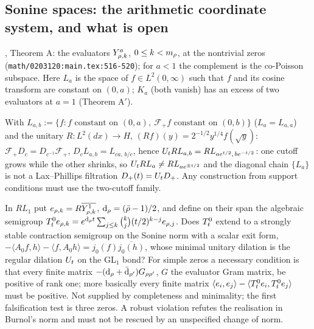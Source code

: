 \subsection{Sonine spaces: the arithmetic coordinate system, and what is open}

\begin{citedfact}
\label{cit:burnol-sonine-evaluators}
\cite{burnol2004systems}, Theorem A: the evaluators $Y^a_{\rho,k}$, $0\le k<m_\rho$, at the nontrivial zeros
\texttt{}
(\texttt{math/0203120:main.tex:516-520}); for $a<1$ the complement is the co-Poisson subspace. Here $L_a$ is the space of
$f\in L^2(0,\infty)$ such that $f$ and its cosine transform are constant on $(0,a)$; $K_a$ (both vanish) has an excess of
two evaluators at $a = 1$ (Theorem A$'$).
\end{citedfact}

\begin{proposition}
\label{prop:sonine-two-cutoff-covariance}
With $L_{a,b} := \{f: f\text{ constant on }(0,a),\ \mathcal F_+f\text{ constant on }(0,b)\}$ ($L_a = L_{a,a}$) and the
unitary $R: L^2(dx)\to H$, $(Rf)(y) = 2^{-1/2}y^{1/4}f(\sqrt y)$: $\mathcal F_+D_c = D_{c^{-1}}\mathcal F_+$,
$D_c L_{a,b} = L_{ca,\,b/c}$, hence $U_t RL_{a,b} = RL_{ae^{t/2},\,be^{-t/2}}$: one cutoff grows
while the other shrinks, so $U_t RL_a\ne RL_{ae^{\pm t/2}}$ and the diagonal chain $\{L_a\}$ is not a
Lax--Phillips filtration $D_+(t) = U_t D_+$. Any construction from support conditions must use the two-cutoff
family.
\end{proposition}

\begin{conjecture}
\label{conj:h-theta-1}
In $RL_1$ put $e_{\rho,k} = R\overline{Y^1_{\rho,k}}$, $\mathrm d_\rho = (\bar{\rho}-1)/2$, and define on their span the
algebraic semigroup $T^0_t e_{\rho,k} = e^{\mathrm d_\rho t}\sum_{j\le k}\binom kj(t/2)^{k-j}e_{\rho,j}$. Does $T^0_t$
extend to a strongly stable contraction semigroup on the Sonine norm with a scalar exit form,
$-\langle A_0f,h\rangle - \langle f,A_0h\rangle = j_0(f)\overline{j_0(h)}$, whose minimal unitary dilation is the
regular dilation $U_t$ on the GL$_1$ bond? For simple zeros a necessary condition is that every finite matrix
$-(\mathrm d_\rho+\bar{\mathrm d}_{\rho'})G_{\rho\rho'}$, $G$ the evaluator Gram matrix, be positive of rank one; more
basically every finite matrix $\langle e_i,e_j\rangle - \langle T^0_t e_i,T^0_t e_j\rangle$ must be positive. Not
supplied by completeness and minimality; the first falsification test is three zeros. A robust violation refutes the
realisation in Burnol's norm and must not be rescued by an unspecified change of norm.
\end{conjecture}

